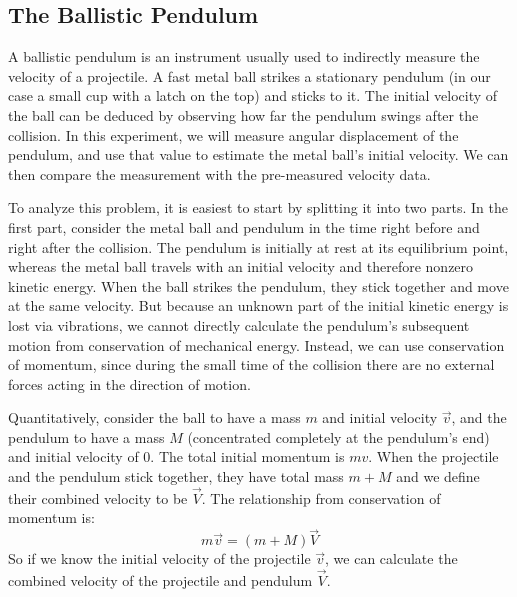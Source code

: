 \subsection{The Ballistic Pendulum}

A ballistic pendulum is an instrument usually used to indirectly measure the velocity of a projectile. A fast metal ball strikes a stationary pendulum (in our case a small cup with a latch on the top) and sticks to it. The initial velocity of the ball can be deduced by observing how far the pendulum swings after the collision. In this experiment, we will measure angular displacement of the pendulum, and use that value to estimate the metal ball's initial velocity. We can then compare the measurement with the pre-measured velocity data. %

To analyze this problem, it is easiest to start by splitting it into two parts. In the first part, consider the metal ball and pendulum in the time right before and right after the collision. The pendulum is initially at rest at its equilibrium point, whereas the metal ball travels with an initial velocity and therefore nonzero kinetic energy. When the ball strikes the pendulum, they stick together and move at the same velocity. But because an unknown part of the initial kinetic energy is lost via vibrations, we cannot directly calculate the pendulum's subsequent motion from conservation of mechanical energy.  Instead, we can use conservation of momentum, since during the small time of the collision there are no external forces acting in the direction of motion.\myskip

Quantitatively, consider the ball to have a mass $m$ and initial velocity $\vec v$, and the pendulum to have a mass $M$ (concentrated completely at the pendulum's end) and initial velocity of 0. The total initial momentum is $mv$. When the projectile and the pendulum stick together, they have total mass $m + M$ and we define their combined velocity to be $\vec V$. The relationship from conservation of momentum is:
\begin{equation}
    m \vec v = (m+M)\vec V
\end{equation}
So if we know the initial velocity of the projectile $\vec v$, we can calculate the combined velocity of the projectile and pendulum $\vec V$.\myskip

